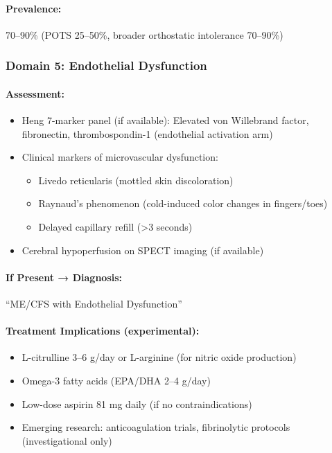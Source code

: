 \paragraph{Prevalence:} 70--90\% (POTS 25--50\%, broader orthostatic intolerance 70--90\%)

\subsubsection{Domain 5: Endothelial Dysfunction}

\paragraph{Assessment:}
\begin{itemize}
    \item Heng 7-marker panel (if available): Elevated von Willebrand factor, fibronectin, thrombospondin-1 (endothelial activation arm)~\cite{heng2025mecfs}
    \item Clinical markers of microvascular dysfunction:
    \begin{itemize}
        \item Livedo reticularis (mottled skin discoloration)
        \item Raynaud's phenomenon (cold-induced color changes in fingers/toes)
        \item Delayed capillary refill (>3 seconds)
    \end{itemize}
    \item Cerebral hypoperfusion on SPECT imaging (if available)
\end{itemize}

\paragraph{If Present → Diagnosis:} ``ME/CFS with Endothelial Dysfunction''

\paragraph{Treatment Implications (experimental):}
\begin{itemize}
    \item L-citrulline 3--6 g/day or L-arginine (for nitric oxide production)
    \item Omega-3 fatty acids (EPA/DHA 2--4 g/day)
    \item Low-dose aspirin 81 mg daily (if no contraindications)
    \item Emerging research: anticoagulation trials, fibrinolytic protocols (investigational only)
\end{itemize}

